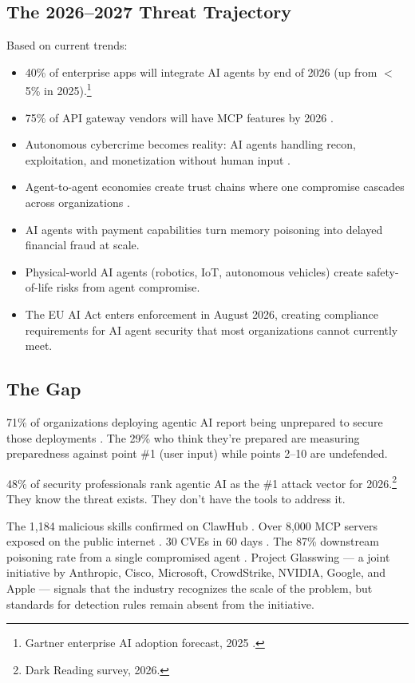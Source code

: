 \documentclass[11pt,letterpaper]{article}
\begin{document}
\subsection{The 2026--2027 Threat Trajectory}

Based on current trends:

\begin{itemize}
\item 40\% of enterprise apps will integrate AI agents by end of 2026 (up from $<$5\% in 2025).\footnote{Gartner enterprise AI adoption forecast, 2025 \cite{gartner}.}
\item 75\% of API gateway vendors will have MCP features by 2026 \cite{gartner}.
\item Autonomous cybercrime becomes reality: AI agents handling recon, exploitation, and monetization without human input \cite{trendmicro}.
\item Agent-to-agent economies create trust chains where one compromise cascades across organizations \cite{galileo}.
\item AI agents with payment capabilities turn memory poisoning into delayed financial fraud at scale.
\item Physical-world AI agents (robotics, IoT, autonomous vehicles) create safety-of-life risks from agent compromise.
\item The EU AI Act enters enforcement in August 2026, creating compliance requirements for AI agent security that most organizations cannot currently meet.
\end{itemize}


\subsection{The Gap}

71\% of organizations deploying agentic AI report being unprepared to secure those deployments \cite{cisco}. The 29\% who think they're prepared are measuring preparedness against point \#1 (user input) while points 2--10 are undefended.

48\% of security professionals rank agentic AI as the \#1 attack vector for 2026.\footnote{Dark Reading survey, 2026.} They know the threat exists. They don't have the tools to address it.

The 1,184 malicious skills confirmed on ClawHub \cite{antiy}. Over 8,000 MCP servers exposed on the public internet \cite{checkmarx,paloalto}. 30 CVEs in 60 days \cite{checkmarx,cosai}. The 87\% downstream poisoning rate from a single compromised agent \cite{galileo}. Project Glasswing \cite{glasswing} --- a joint initiative by Anthropic, Cisco, Microsoft, CrowdStrike, NVIDIA, Google, and Apple --- signals that the industry recognizes the scale of the problem, but standards for detection rules remain absent from the initiative.
\end{document}
